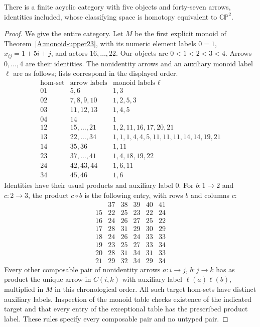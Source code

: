 \begin{theorem}[Proved]\label{A7:model47}
There is a finite acyclic category with five objects and forty-seven
arrows, identities included, whose classifying space is homotopy
equivalent to $\mathbb{CP}^2$.
\end{theorem}
\begin{proof}
We give the entire category. Let $M$ be the first explicit monoid
of Theorem~\ref{A:monoid-upper23}, with its numeric element labels
$0=1$, $x_{ij}=1+5i+j$, and actors $16,\ldots,22$.
Our objects are $0<1<2<3<4$. Arrows $0,\ldots,4$ are their
identities. The nonidentity arrows and an auxiliary monoid label
$\ell$ are as follows; lists correspond in the displayed order.
\[
\begin{array}{c|c|l}
\text{hom-set}&\text{arrow labels}&\text{monoid labels }\ell\\\hline
01&5,6&1,3\\
02&7,8,9,10&1,2,5,3\\
03&11,12,13&1,4,5\\
04&14&1\\
12&15,\ldots,21&1,2,11,16,17,20,21\\
13&22,\ldots,34&1,1,1,4,4,5,11,11,11,14,14,19,21\\
14&35,36&1,11\\
23&37,\ldots,41&1,4,18,19,22\\
24&42,43,44&1,6,11\\
34&45,46&1,6
\end{array}
\]
Identities have their usual products and auxiliary label $0$.
For $b:1\to2$ and $c:2\to3$, the product $c\circ b$ is the
following entry, with rows $b$ and columns $c$:
\[
\begin{array}{c|rrrrr}
 &37&38&39&40&41\\\hline
15&22&25&23&22&24\\
16&24&26&27&25&22\\
17&28&31&29&30&29\\
18&24&26&24&33&33\\
19&23&25&27&33&34\\
20&28&31&34&31&33\\
21&29&32&34&29&34
\end{array}
\]
Every other composable pair of nonidentity arrows
$a:i\to j$, $b:j\to k$ has as product the unique arrow
in $C(i,k)$ with auxiliary label $\ell(a)\ell(b)$, multiplied
in $M$ in this chronological order. All such target hom-sets
have distinct auxiliary labels. Inspection of the monoid table
checks existence of the indicated target and that every entry
of the exceptional table has the prescribed product label.
These rules specify every composable pair and no untyped pair.


\end{proof}
